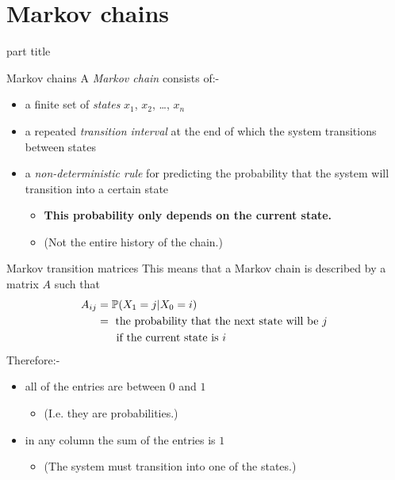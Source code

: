\documentclass{beamer}
\begin{document}
\section{Markov chains}

\begin{frame}
\begin{beamercolorbox}[sep=12pt,center]{part title}
\insertsection\par
\end{beamercolorbox}
\end{frame}

\begin{frame}{Markov chains}
A \emph{Markov chain} consists of:-\vfill
\begin{itemize}
	\item a finite set of \emph{states} $x_1$, $x_2$, \dots, $x_n$\vfill
	\item a repeated \emph{transition interval} at the end of which the system transitions between states\vfill
	\item a \emph{non-deterministic rule} for predicting the probability that the system will transition into a certain state
	\begin{itemize}
		\item {\bf This probability only depends on the current state.}
		\item (Not the entire history of the chain.)
	\end{itemize}
\end{itemize}
\end{frame}

\begin{frame}{Markov transition matrices}
This means that a Markov chain is described by a matrix $A$ such that
\begin{align*}
A_{ij} &= \mathbb{P}(X_1 = j | X_0 = i)\\
&= \text{ the probability that the next state will be $j$ }\\
&\hspace{0.5cm} \text{ if the current state is $i$}
\end{align*}
Therefore:-
\begin{itemize}
	\item all of the entries are between $0$ and $1$
	\begin{itemize}
		\item (I.e. they are probabilities.)
	\end{itemize}
	\item in any column the sum of the entries is $1$
	\begin{itemize}
		\item (The system must transition into one of the states.)
	\end{itemize}
\end{itemize}
\end{frame}
\end{document}
